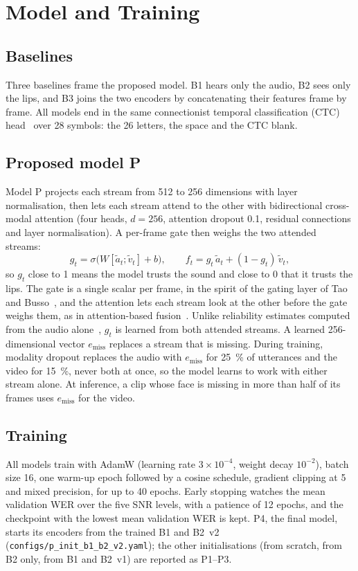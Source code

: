 \section{Model and Training}
\label{sec:model}

\subsection{Baselines}
Three baselines frame the proposed model. B1 hears only the audio, B2 sees only the lips, and
B3 joins the two encoders by concatenating their features frame by frame. All models end in
the same connectionist temporal classification (CTC) head~\cite{graves2006} over 28 symbols:
the 26 letters, the space and the CTC blank.

\subsection{Proposed model P}
Model P projects each stream from 512 to 256 dimensions with layer normalisation, then lets
each stream attend to the other with bidirectional cross-modal attention (four heads,
$d = 256$, attention dropout 0.1, residual connections and layer normalisation). A per-frame
gate then weighs the two attended streams:
\begin{equation}
g_t = \sigma\big(W [\tilde{a}_t; \tilde{v}_t] + b\big), \qquad
f_t = g_t\, \tilde{a}_t + (1 - g_t)\, \tilde{v}_t ,
\end{equation}
so $g_t$ close to 1 means the model trusts the sound and close to 0 that it trusts the lips.
The gate is a single scalar per frame, in the spirit of the gating layer of Tao and
Busso~\cite{tao2018}, and the attention lets each stream look at the other before the gate weighs
them, as in attention-based fusion~\cite{sterpu2018}. Unlike reliability estimates computed from
the audio alone~\cite{meutzner2017}, $g_t$ is learned from both attended streams.
A learned 256-dimensional vector $e_{\text{miss}}$ replaces a stream that is missing. During
training, modality dropout replaces the audio with $e_{\text{miss}}$ for 25~\% of utterances
and the video for 15~\%, never both at once, so the model learns to work with either stream
alone. At inference, a clip whose face is missing in more than half of its frames uses
$e_{\text{miss}}$ for the video.

\subsection{Training}
All models train with AdamW (learning rate $3 \times 10^{-4}$, weight decay $10^{-2}$), batch
size 16, one warm-up epoch followed by a cosine schedule, gradient clipping at 5 and mixed
precision, for up to 40 epochs. Early stopping watches the mean validation WER over the five
SNR levels, with a patience of 12 epochs, and the checkpoint with the lowest mean validation
WER is kept. P4, the final model, starts its encoders from the trained B1 and B2~v2
(\texttt{configs/\allowbreak{}p\_\allowbreak{}init\_\allowbreak{}b1\_\allowbreak{}b2\_\allowbreak{}v2.yaml}); the other initialisations (from scratch, from B2
only, from B1 and B2~v1) are reported as P1--P3.

